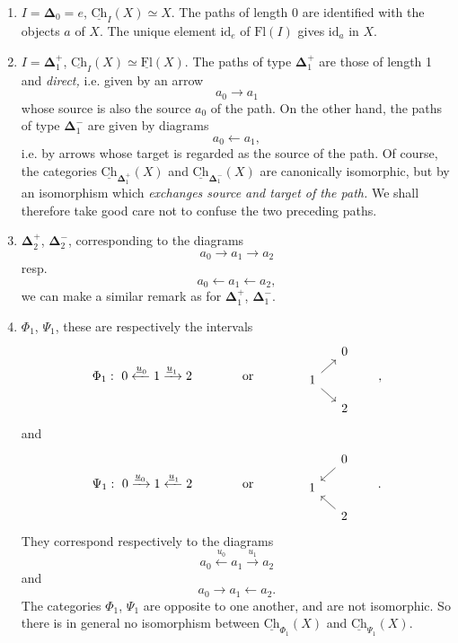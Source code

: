 \documentclass[11pt]{article}
\newcommand{\printedpage}[1]{\marginpar{\footnotesize p.~#1}}
\newcommand{\msp}[1]{\marginpar{\footnotesize [#1]}}
\newcommand{\Ch}{\underline{\mathrm{Ch}}}
\newcommand{\uFl}{\underline{\mathrm{Fl}}}
\newcommand{\bDelta}{\boldsymbol{\Delta}}
\begin{document}
\begin{enumerate}
\item[1.] $I = \bDelta_0 = e$, $\Ch_I(X) \simeq X$. The paths of length 0 are identified with the objects $a$ of $X$. The unique element $\mathrm{id}_e$ of $\mathrm{Fl}(I)$ gives $\mathrm{id}_a$ in $X$.

\item[2.] $I = \bDelta_1^+$, $\Ch_I(X) \simeq \uFl(X)$. The paths of type $\bDelta_1^+$ are those of length 1 and \textit{direct,} i.e. given by an arrow
\[
a_0 \longrightarrow a_1
\]
whose source is also the source $a_0$ of the path. On the other hand, the paths of type $\bDelta_1^-$ are given by diagrams
\[
a_0 \longleftarrow a_1,
\]
i.e. by arrows whose target is regarded as the source of the path. Of course, the categories $\Ch_{\bDelta_1^+}(X)$ and $\Ch_{\bDelta_1^-}(X)$ are canonically isomorphic, but by an isomorphism which \textit{exchanges source and target of the path.} We shall therefore take good care not to confuse the two preceding paths.

\msp{page 16}

\item[3.] $\bDelta_2^+$, $\bDelta_2^-$, corresponding to the diagrams
\[
a_0 \longrightarrow a_1 \longrightarrow a_2
\]
resp.
\[
a_0 \longleftarrow a_1 \longleftarrow a_2,
\]
we can make a similar remark as for $\bDelta_1^+$, $\bDelta_1^-$.

\printedpage{11}

\item[4.] $\Phi_1$, $\Psi_1$, these are respectively the intervals
\[
\Phi_1 :\ 0 \xleftarrow{\underline{u}_0} 1 \xrightarrow{\underline{u}_1} 2 \qquad\qquad \text{or} \qquad\qquad
\begin{tikzcd}[row sep=small, column sep=small]
 & 0 \\
1 \arrow[ur] \arrow[dr] & \\
 & 2
\end{tikzcd}
\qquad , %
\]
and
\[
\Psi_1 :\ 0 \xrightarrow{\underline{u}_0} 1 \xleftarrow{\underline{u}_1} 2 \qquad\qquad \text{or} \qquad\qquad
\begin{tikzcd}[row sep=small, column sep=small]
 & 0 \arrow[dl] \\
1 & \\
 & 2 \arrow[ul]
\end{tikzcd}
\qquad .
\]
They correspond respectively to the diagrams
\[
a_0 \xleftarrow{u_0} a_1 \xrightarrow{u_1} a_2
\]
and
\[
a_0 \longrightarrow a_1 \longleftarrow a_2.
\]
The categories $\Phi_1$, $\Psi_1$ are opposite to one another, and are not isomorphic. So there is in general no isomorphism between $\Ch_{\Phi_1}(X)$ and $\Ch_{\Psi_1}(X)$.
\end{enumerate}
\end{document}
